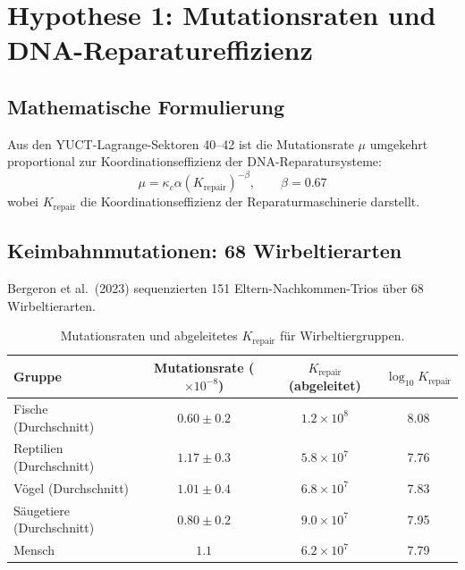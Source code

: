 \documentclass[11pt,a4paper]{article}
\begin{document}
	\section{Hypothese 1: Mutationsraten und DNA-Reparatureffizienz}
	
	\subsection{Mathematische Formulierung}
	
	Aus den YUCT-Lagrange-Sektoren 40--42 ist die Mutationsrate \(\mu\) umgekehrt proportional zur Koordinationseffizienz der DNA-Reparatursysteme:
	\begin{equation}
		\mu = \kappa_c \alpha \left(K_{\text{repair}}\right)^{-\beta}, \qquad \beta = 0.67
		\label{eq:mutation-rate}
	\end{equation}
	wobei \(K_{\text{repair}}\) die Koordinationseffizienz der Reparaturmaschinerie darstellt.
	
	\subsection{Keimbahnmutationen: 68 Wirbeltierarten}
	
	Bergeron et al.\ (2023) sequenzierten 151 Eltern-Nachkommen-Trios über 68 Wirbeltierarten.
	
	\begin{table}[H]
		\centering
		\caption{Mutationsraten und abgeleitetes \(K_{\text{repair}}\) für Wirbeltiergruppen.}
		\label{tab:vertebrate-mutations}
		\begin{tabular}{lccc}
			\toprule
			\textbf{Gruppe} & \textbf{Mutationsrate (\(\times 10^{-8}\))} & \textbf{\(K_{\text{repair}}\) (abgeleitet)} & \(\log_{10} K_{\text{repair}}\) \\
			\midrule
			Fische (Durchschnitt) & \(0.60 \pm 0.2\) & \(1.2 \times 10^8\) & 8.08 \\
			Reptilien (Durchschnitt) & \(1.17 \pm 0.3\) & \(5.8 \times 10^7\) & 7.76 \\
			Vögel (Durchschnitt) & \(1.01 \pm 0.4\) & \(6.8 \times 10^7\) & 7.83 \\
			Säugetiere (Durchschnitt) & \(0.80 \pm 0.2\) & \(9.0 \times 10^7\) & 7.95 \\
			Mensch & \(1.1\) & \(6.2 \times 10^7\) & 7.79 \\
			\bottomrule
		\end{tabular}
	\end{table}
	
\end{document}
